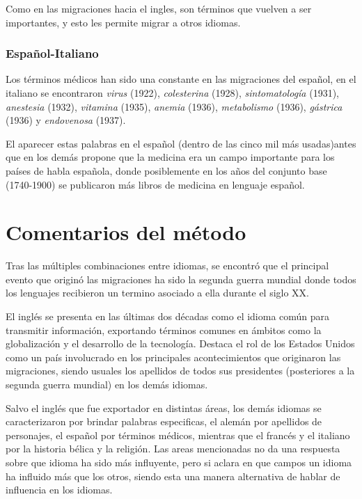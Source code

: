 {Como en las migraciones hacia el ingles, son términos que vuelven a ser importantes,  y esto les permite migrar a otros idiomas. 


\subsubsection*{Español-Italiano}%

Los términos médicos han sido una constante en las migraciones del español, en el italiano se encontraron \textit{virus} (1922), \textit{colesterina} (1928),  \textit{sintomatología} (1931), \textit{anestesia} (1932), \textit{vitamina} (1935), \textit{anemia} (1936), \textit{metabolismo} (1936),  \textit{gástrica} (1936)  y \textit{endovenosa} (1937).  

El aparecer estas palabras en el español (dentro de las cinco mil más usadas)antes que en los demás propone que la medicina era un campo importante para los países de habla española, donde posiblemente en los años del conjunto base (1740-1900) se publicaron más libros de medicina en lenguaje español. 






\section{Comentarios del método}%



Tras las múltiples combinaciones entre idiomas, se  encontró que el principal evento que originó las migraciones ha sido la segunda guerra mundial donde todos los lenguajes recibieron un termino asociado a ella durante el siglo XX.  

El inglés se presenta en las últimas dos décadas como el idioma común para transmitir información, exportando términos comunes en ámbitos como  la globalización y el desarrollo  de la tecnología.  Destaca el rol de los Estados Unidos como un país involucrado en los principales acontecimientos que originaron las migraciones, siendo usuales los apellidos de todos sus presidentes (posteriores a la segunda guerra mundial) en los demás idiomas. 

Salvo el inglés que fue exportador en distintas áreas, los demás idiomas se caracterizaron por brindar palabras especificas,  el alemán por apellidos de personajes, el español por términos médicos, mientras que el francés y el italiano por la historia bélica y la religión.  Las areas mencionadas no da una respuesta sobre que idioma ha sido más influyente, pero si aclara en que campos un idioma ha influido más que los otros, siendo esta una manera alternativa de hablar de influencia en los idiomas. 

}
